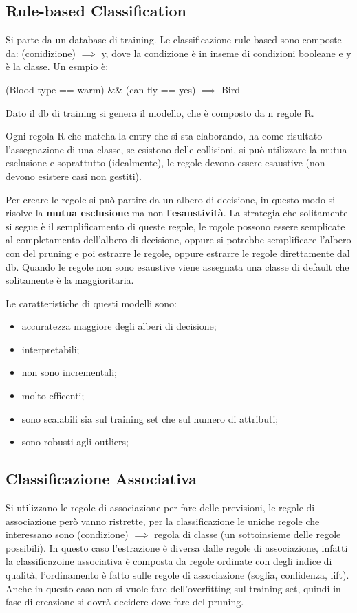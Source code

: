 \documentclass[12pt]{article}
\begin{document}
\subsection{Rule-based Classification}
Si parte da un database di training. Le classificazione rule-based sono composte da: (conidizione) $ \implies $ y, dove la condizione \`e in inseme di condizioni booleane e y \`e la classe. Un esmpio \`e:
\begin{center}
    (Blood type == warm) \&\& (can fly == yes) $ \implies$ Bird
\end{center}
Dato il db di training si genera il modello, che \`e composto da n regole R.

Ogni regola R che matcha la entry che si sta elaborando, ha come risultato l'assegnazione di una classe, se esistono delle collisioni, si pu\`o utilizzare la mutua esclusione e soprattutto (idealmente), le regole devono essere esaustive (non devono esistere casi non gestiti).

Per creare le regole si pu\`o partire da un albero di decisione, in questo modo si risolve la \textbf{mutua esclusione} ma non l'\textbf{esaustivit\`a}. La strategia che solitamente si segue \`e il semplificamento di queste regole, le rogole possono essere semplicate al completamento dell'albero di decisione, oppure si potrebbe semplificare l'albero con del pruning e poi estrarre le regole, oppure estrarre  le regole direttamente dal db. Quando le regole non sono esaustive viene assegnata una classe di default che solitamente \`e la maggioritaria.

Le caratteristiche di questi modelli sono:
\begin{itemize}
    \item accuratezza maggiore degli alberi di decisione;
    \item interpretabili;
    \item non sono incrementali;
    \item molto efficenti;
    \item sono scalabili sia sul training set che sul numero di attributi;
    \item sono robusti agli outliers;
\end{itemize}


\subsection{Classificazione Associativa}
Si utilizzano le regole di associazione per fare delle previsioni, le regole di associazione per\`o vanno ristrette, per la classificazione le uniche regole che interessano sono (condizione) $ \implies $ regola di classe (un sottoinsieme delle regole possibili). In questo caso l'estrazione \`e diversa dalle regole di associazione, infatti la classificazoine associativa \`e composta da regole ordinate con degli indice di qualit\`a, l'ordinamento \`e fatto sulle regole di associazione (soglia, confidenza, lift). Anche in questo caso non si vuole fare dell'overfitting sul training set, quindi in fase di creazione si dovr\`a decidere dove fare del pruning.
\end{document}

